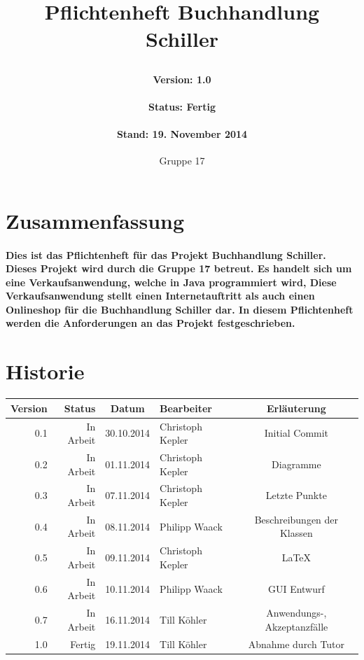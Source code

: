 \documentclass[a4paper]{article}
\author{Gruppe 17}
\date{}
\title{
	\normalfont
	\normalsize 
	\huge{Pflichtenheft Buchhandlung Schiller}
	\horrule{0.5pt}
	\paragraph{Version: 1.0}
	\paragraph{Status: Fertig}
	\paragraph{Stand: 19. November 2014}
	\horrule{2pt}
}
\begin{document}
\maketitle

\newpage
 
\section*{Zusammenfassung}

\paragraph{Dies ist das Pflichtenheft für das Projekt Buchhandlung Schiller. Dieses Projekt wird durch die Gruppe 17 betreut. Es handelt sich um eine Verkaufsanwendung, welche in Java programmiert wird, Diese Verkaufsanwendung stellt einen Internetauftritt als auch einen Onlineshop für die Buchhandlung Schiller dar. In diesem Pflichtenheft werden die Anforderungen an das Projekt festgeschrieben.}
 
\section*{Historie}

\begin{tabular}{|r|r|c|l|c|}
	\hline
	\rowcolor[HTML]{C0C0C0} 
	Version & Status    & Datum      & Bearbeiter       & Erläuterung    	\\ \hline
	0.1     & In Arbeit & 30.10.2014 & Christoph Kepler & Initial Commit 	\\ \hline
	0.2     & In Arbeit & 01.11.2014 & Christoph Kepler & Diagramme      	\\ \hline
	0.3     & In Arbeit & 07.11.2014 & Christoph Kepler & Letzte Punkte  	\\ \hline
	0.4	& In Arbeit & 08.11.2014 & Philipp Waack & Beschreibungen der Klassen \\ \hline
	0.5	& In Arbeit & 09.11.2014 & Christoph Kepler	& \LaTeX			\\ \hline
	0.6	& In Arbeit & 10.11.2014 & Philipp Waack & GUI Entwurf \\ \hline
	0.7	& In Arbeit & 16.11.2014 & Till Köhler & Anwendungs-, Akzeptanzfälle \\ \hline
	1.0	& Fertig	& 19.11.2014 & Till Köhler & Abnahme durch Tutor \\ \hline	
\end{tabular}
\end{document}
